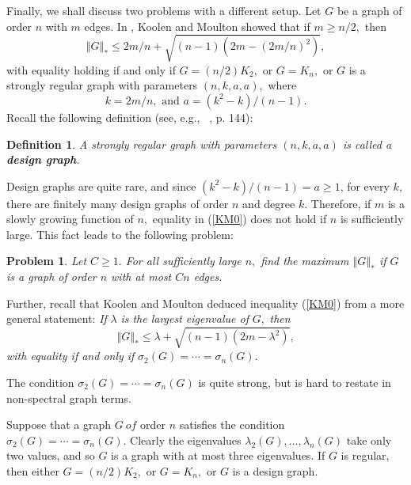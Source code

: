 \documentclass[12pt]{article}%
\newtheorem{definition}[theorem]{Definition}
\newtheorem{problem}[theorem]{Problem}
\begin{document}
Finally, we shall discuss two problems with a different setup. Let $G$ be a
graph of order $n$ with $m$ edges. In \cite{KoMo01}, Koolen and Moulton showed
that if $m\geq n/2,$ then
\begin{equation}
\left\Vert G\right\Vert _{\ast}\leq2m/n+\sqrt{\left(  n-1\right)  \left(
2m-\left(  2m/n\right)  ^{2}\right)  }, \label{KM0}%
\end{equation}
with equality holding if and only if $G=\left(  n/2\right)  K_{2},$ or
$G=K_{n},$ or $G$ is a strongly regular graph with parameters $\left(
n,k,a,a\right)  ,$ where
\[
k=2m/n,\text{ \ \ and \ \ }a=\left(  k^{2}-k\right)  /\left(  n-1\right)  .
\]
Recall the following definition (see, e.g., \ \cite{BJK99}, p. 144):

\begin{definition}
A strongly regular graph with parameters $\left(  n,k,a,a\right)  $ is called
a \textbf{design graph}.
\end{definition}

Design graphs are quite rare, and since $\left(  k^{2}-k\right)  /\left(
n-1\right)  =a\geq1$, for every $k,$ there are finitely many design graphs of
order $n$ and degree $k.$ Therefore, if $m$ is a slowly growing function of
$n,$ equality in (\ref{KM0}) does not hold if $n$ is sufficiently large. This
fact leads to the following problem:

\begin{problem}
Let $C\geq1.$ For all sufficiently large $n,$ find the maximum $\left\Vert
G\right\Vert _{\ast}$ if $G$ is a graph of order $n$ with at most $Cn$ edges.
\end{problem}

Further, recall that Koolen and Moulton deduced inequality (\ref{KM0}) from a
more general statement: \emph{If }$\lambda$\emph{ is the largest eigenvalue of
}$G,$\emph{ then}%
\begin{equation}
\left\Vert G\right\Vert _{\ast}\leq\lambda+\sqrt{\left(  n-1\right)  \left(
2m-\lambda^{2}\right)  }, \label{KM1}%
\end{equation}
\emph{with equality if and only if }$\sigma_{2}\left(  G\right)
=\cdots=\sigma_{n}\left(  G\right)  .$

The condition $\sigma_{2}\left(  G\right)  =\cdots=\sigma_{n}\left(  G\right)
$ is quite strong, but is hard to restate in non-spectral graph terms.

Suppose that a graph $G\ of$ order $n$ satisfies the condition $\sigma
_{2}\left(  G\right)  =\cdots=\sigma_{n}\left(  G\right)  .$ Clearly the
eigenvalues $\lambda_{2}\left(  G\right)  ,\ldots,\lambda_{n}\left(  G\right)
$ take only two values, and so $G$ is a graph with at most three eigenvalues.
If $G$ is regular, then either $G=\left(  n/2\right)  K_{2},$ or $G=K_{n},$ or
$G$ is a design graph.
\end{document}
